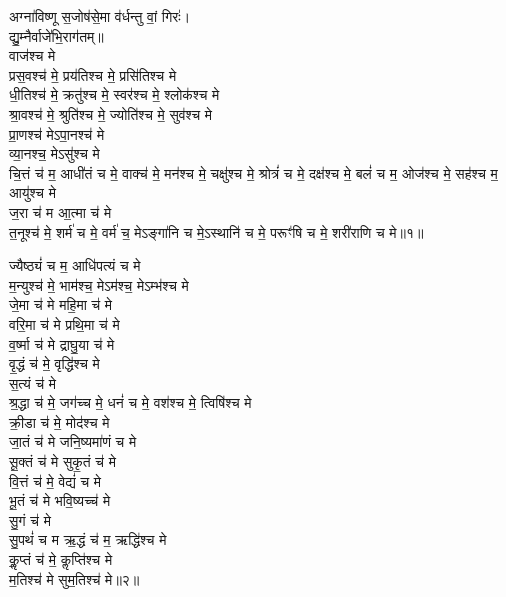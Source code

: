 

अग्ना॑विष्णू स॒जोष॑से॒मा व॑र्धन्तु वां॒ गिरः॑।\\
द्यु॒म्नैर्वाजे॑भि॒रा\-ग॑तम्॥\\ 
वाज॑श्च मे\\
प्रस॒वश्च॑ मे॒ प्रय॑तिश्च मे॒ प्रसि॑तिश्च मे\\
धी॒तिश्च॑ मे॒ क्रतु॑श्च मे॒ स्वर॑श्च मे॒ श्लोक॑श्च मे\\
श्रा॒वश्च॑ मे॒ श्रुति॑श्च मे॒ ज्योति॑श्च मे॒ सुव॑श्च मे\\
प्रा॒णश्च॑ मेऽपा॒नश्च॑ मे\\
व्या॒नश्च॒ मेऽसु॑श्च मे\\
चि॒त्तं च॑ म॒ आधी॑तं च मे॒ वाक्च॑ मे॒ मन॑श्च मे॒ चक्षु॑श्च मे॒ श्रोत्रं॑ च मे॒ दक्ष॑श्च मे॒ बलं॑ च म॒ ओज॑श्च मे॒ सह॑श्च म॒ आयु॑श्च मे\\
ज॒रा च॑ म आ॒त्मा च॑ मे\\
त॒नूश्च॑ मे॒ शर्म॑ च मे॒ वर्म॑ च॒ मेऽङ्गा॑नि च मे॒ऽस्थानि॑ च मे॒ परूꣳ॑षि च मे॒ शरी॑राणि च मे॥१॥ 

ज्यैष्ठ्यं॑ च म॒ आधि॑पत्यं च मे\\
म॒न्युश्च॑ मे॒ भाम॑श्च॒ मेऽम॑श्च॒ मेऽम्भ॑श्च मे\\
जे॒मा च॑ मे महि॒मा च॑ मे\\
वरि॒मा च॑ मे प्रथि॒मा च॑ मे\\
व॒र्ष्मा च॑ मे द्राघु॒या च॑ मे\\
वृ॒द्धं च॑ मे॒ वृद्धि॑श्च मे\\
स॒त्यं च॑ मे\\
श्र॒द्धा च॑ मे॒ जग॑च्च मे॒ धनं॑ च मे॒ वश॑श्च मे॒ त्विषि॑श्च मे\\
क्री॒डा च॑ मे॒ मोद॑श्च मे\\
जा॒तं च॑ मे जनि॒ष्यमा॑णं च मे\\
सू॒क्तं च॑ मे सुकृ॒तं च॑ मे\\
वि॒त्तं च॑ मे॒ वेद्यं॑ च मे\\
भू॒तं च॑ मे भवि॒ष्यच्च॑ मे\\
सु॒गं च॑ मे\\
सु॒पथं॑ च म ऋ॒द्धं च॑ म॒ ऋद्धि॑श्च मे\\
कॢ॒प्तं च॑ मे॒ कॢप्ति॑श्च मे\\
म॒तिश्च॑ मे सुम॒तिश्च॑ मे॥२॥ 

